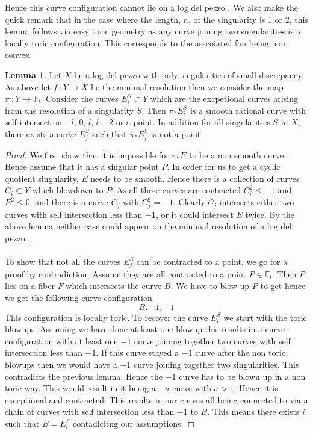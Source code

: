\documentclass[11pt]{report}
\theoremstyle{definition}
\theoremstyle{definition}
\theoremstyle{definition}
\theoremstyle{definition}
\theoremstyle{definition}
\newtheorem{lem}[thm]{Lemma}
\theoremstyle{definition}
\theoremstyle{definition}
\theoremstyle{definition}
\newcommand{\ldp}{log del pezzo }
\newcommand{\mb}[1]{\mathbb{#1}}
\newcommand{\minres}{minimal resolution }
\begin{document}
Hence this curve configuration cannot lie on a \ldp. We also make the quick remark that in the case where the length, $n$, of the singularity is 1 or 2, this lemma follows via easy toric geometry as any curve joining two singularities is a locally toric configuration. This corresponds to the asscoiated fan being non convex. 
\begin{lem}
Let $X$ be a \ldp with only singularities of small discrepancy. As above let $f \: : Y \rightarrow X$ be the \minres then we consider the map $\pi \: : Y \rightarrow \mathbb{F}_l$. Consider the curves $E_i^S \subset Y$ which are the excpetional curves arising from the resolution of a singularity $S$. Then $\pi_* E_i^S$ is a smooth rational curve with self intersection $-l, \,0, \, l, \, l+2$ or a point. In addition for all singularities $S$ in $X$, there exists a curve $E_j^S$ such that $\pi_* E_j^S$ is not a point.

\end{lem}
\begin{proof}
We first show that it is impossible for $\pi_* E$ to be a non smooth curve. Hence assume that it has a singular point $P$. In order for us to get a cyclic quotient singularity, $E$ needs to be smooth. Hence there is a collection of curves $C_i \subset Y$ which blowdown to $P$. As all these curves are contracted $C_i^2 \leq  -1$ and $E^2 \leq 0$, and there is a curve $C_j$ with $C_j^2 = -1$. Clearly $C_j$ intersects either two curves with self intersection less than $-1$, or it could intersect $E$ twice. By the above lemma neither case could appear on the \minres of a \ldp.
\\
\\
To show that not all the curves $E_j^S$ can be contracted to a point, we go for a proof by contradiction. Assume they are all contracted to a point $P \in \mb{F}_l$. Then $P$ lies on a fiber $F$ which intersects the curve $B$. We have to blow up $P$ to get hence we get the following curve configuration. 
\[
B, -1, -1
\]
This configuration is locally toric. To recover the curve $E_i^S$ we  start with the toric blowups. Assuming we have done at least one blowup this results in a curve configuration with at least one $-1$ curve joining together two curves with self intersection less than $-1$. If this curve stayed a $-1$ curve after the non toric blowups then we would have a $-1$ curve joining together two singularities. This contradicts the previous lemma. Hence the $-1$ curve has to be blown up in a non toric way. This would result in it being a $-a$ curve with $a>1$. Hence it is exceptional and contracted. This results in our curves all being connected to via a chain of curves  with self intersection less than $-1$ to $B$. This means there exists $i$ such that $B = E_i^S$ contadicitng our assumptions.
\end{proof}
\end{document}
